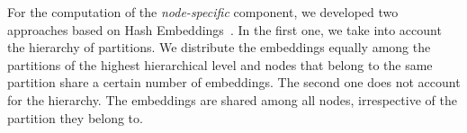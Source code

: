 \documentclass[conference]{IEEEtran}
\begin{document}
For the computation of the \textit{node-specific} component, we developed two approaches based on Hash Embeddings~\cite{svenstrup2017hash}. 
% 
% 
In the first one, we take into account the hierarchy of partitions. We distribute the embeddings equally among the partitions of the highest hierarchical level and nodes that belong to the same partition share a certain number of embeddings.
% 
The second one does not account for the hierarchy. The embeddings are shared among all nodes, irrespective of the partition they belong to.
% 







\end{document}
